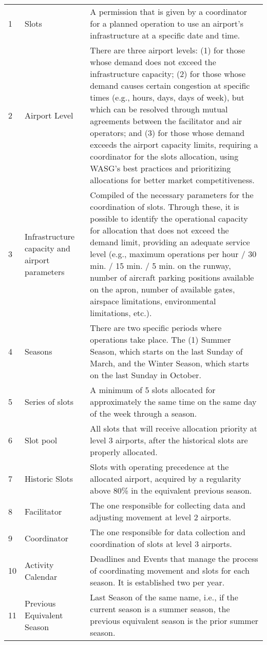 \begin{center}
\begin{xltabular}{\textwidth}{p{0.5cm} p{4cm} p{10cm}}
1 & Slots & A permission that is given by a coordinator for a planned operation to use an airport's infrastructure at a specific date and time. \\ 
2 & Airport Level & There are three airport levels: (1) for those whose demand does not exceed the infrastructure capacity; (2) for those whose demand causes certain congestion at specific times (e.g., hours, days, days of week), but which can be resolved through mutual agreements between the facilitator and air operators; and (3) for those whose demand exceeds the airport capacity limits, requiring a coordinator for the slots allocation, using WASG's best practices and prioritizing allocations for better market competitiveness. \\
3 & Infrastructure capacity and airport parameters & Compiled of the necessary parameters for the coordination of slots. Through these, it is possible to identify the operational capacity for allocation that does not exceed the demand limit, providing an adequate service level (e.g., maximum operations per hour / 30 min. / 15 min. / 5 min. on the runway, number of aircraft parking positions available on the apron, number of available gates, airspace limitations, environmental limitations, etc.). \\
4 & Seasons & There are two specific periods where operations take place. The (1) Summer Season, which starts on the last Sunday of March, and the Winter Season, which starts on the last Sunday in October. \\
5 & Series of slots & A minimum of 5 slots allocated for approximately the same time on the same day of the week through a season. \\
6 & Slot pool & All slots that will receive allocation priority at level 3 airports, after the historical slots are properly allocated. \\
7 & Historic Slots & Slots with operating precedence at the allocated airport, acquired by a regularity above 80\% in the equivalent previous season. \\
8 & Facilitator & The one responsible for collecting data and adjusting movement at level 2 airports. \\
9 & Coordinator & The one responsible for data collection and coordination of slots at level 3 airports. \\
10 & Activity Calendar & Deadlines and Events that manage the process of coordinating movement and slots for each season. It is established two per year. \\
11 & Previous Equivalent Season & Last Season of the same name, i.e., if the current season is a summer season, the previous equivalent season is the prior summer season. \\

\end{xltabular}
\end{center}
